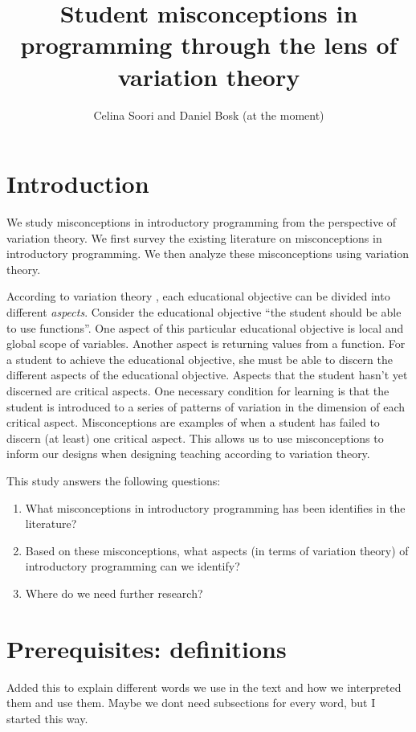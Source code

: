 \documentclass[onecolumn]{article}
\title{Student misconceptions in programming through the lens of variation 
theory}
\author{Celina Soori and Daniel Bosk (at the moment)}
\begin{document}
\maketitle
\tableofcontents

\section{Introduction}

We study misconceptions in introductory programming from the perspective of 
variation theory.
We first survey the existing literature on misconceptions in introductory 
programming.
We then analyze these misconceptions using variation theory.

According to variation theory \parencite[Ch.~2]{NCOL}, each educational 
objective can be divided into different \emph{aspects}.
Consider the educational objective \enquote{the student should be able to use 
functions}.
One aspect of this particular educational objective is local and global scope 
of variables.
Another aspect is returning values from a function.
For a student to achieve the educational objective, she must be able to discern 
the different aspects of the educational objective.
Aspects that the student hasn't yet discerned are critical aspects.
One necessary condition for learning is that the student is introduced to a 
series of patterns of variation in the dimension of each critical aspect.
Misconceptions are examples of when a student has failed to discern (at least) 
one critical aspect.
This allows us to use misconceptions to inform our designs when designing 
teaching according to variation theory.

This study answers the following questions:
\begin{enumerate}
  \item What misconceptions in introductory programming has been identifies in 
    the literature?
  \item Based on these misconceptions, what aspects (in terms of variation 
    theory) of introductory programming can we identify?
  \item Where do we need further research?
\end{enumerate}


\section{Prerequisites: definitions}

Added this to explain different words we use in the text and how we interpreted them and use them. Maybe we dont need subsections for every word, but I started this way.
\end{document}
